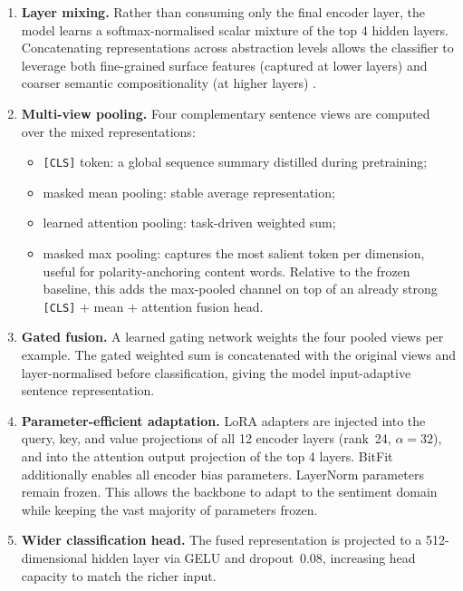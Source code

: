 \documentclass{article}
\begin{document}
\begin{enumerate}
  \item \textbf{Layer mixing.}  Rather than consuming only the final encoder
    layer, the model learns a softmax-normalised scalar mixture of the top 4
    hidden layers.  Concatenating representations across abstraction levels
    allows the classifier to leverage both fine-grained surface features
    (captured at lower layers) and coarser semantic compositionality (at higher
    layers) \citep{tenney2019bert}.

  \item \textbf{Multi-view pooling.}  Four complementary sentence views are
    computed over the mixed representations:
    \begin{itemize}
      \item \texttt{[CLS]} token: a global sequence summary distilled during
        pretraining;
      \item masked mean pooling: stable average representation;
      \item learned attention pooling: task-driven weighted sum;
      \item masked max pooling: captures the most salient token per dimension,
    useful for polarity-anchoring content words.  Relative to the frozen
    baseline, this adds the max-pooled channel on top of an already strong
    \texttt{[CLS]} + mean + attention fusion head.
    \end{itemize}

  \item \textbf{Gated fusion.}  A learned gating network weights the four
    pooled views per example.  The gated weighted sum is concatenated with the
    original views and layer-normalised before classification, giving the model
    input-adaptive sentence representation.

  \item \textbf{Parameter-efficient adaptation.}  LoRA adapters
    \citep{hu2022lora} are injected into the query, key, and value projections
    of all 12 encoder layers (rank~24, $\alpha=32$), and into the attention
    output projection of the top 4 layers.  BitFit \citep{zaken2022bitfit}
    additionally enables all encoder bias parameters.  LayerNorm parameters
    remain frozen.  This allows the backbone to adapt to the sentiment domain
    while keeping the vast majority of parameters frozen.

  \item \textbf{Wider classification head.}  The fused representation is
    projected to a 512-dimensional hidden layer via GELU and dropout~0.08,
    increasing head capacity to match the richer input.
\end{enumerate}
\end{document}
